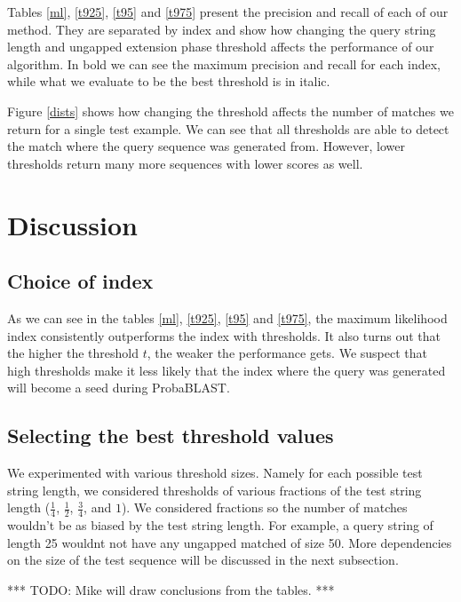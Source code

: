 \documentclass[12pt]{IEEEtran}
\begin{document}
Tables \ref{ml}, \ref{t925}, \ref{t95} and \ref{t975} present the precision and recall of each of our method. They are separated by index and show how changing the query string length and ungapped extension phase threshold affects the performance of our algorithm. In bold we can see the maximum precision and recall for each index, while what we evaluate to be the best threshold is in italic.

Figure \ref{dists} shows how changing the threshold affects the number of matches we return for a single test example. We can see that all thresholds are able to detect the match where the query sequence was generated from. However, lower thresholds return many more sequences with lower scores as well.


\section{Discussion}

\subsection{Choice of index}

As we can see in the tables \ref{ml}, \ref{t925}, \ref{t95} and \ref{t975}, the maximum likelihood index consistently outperforms the index with thresholds. It also turns out that the higher the threshold $t$, the weaker the performance gets. We suspect that high thresholds make it less likely that the index where the query was generated will become a seed during ProbaBLAST. 

\subsection{Selecting the best threshold values}


We experimented with various threshold sizes. Namely for each possible test string length, we considered thresholds of various fractions of the test string length ($\frac{1}{4}$, $\frac{1}{2}$, $\frac{3}{4}$, and $1$). We considered fractions so the number of matches wouldn't be as biased by the test string length. For example, a query string of length 25 wouldnt not have any ungapped matched of size 50. More dependencies on the size of the test sequence will be discussed in the next subsection.

*** TODO: Mike will draw conclusions from the tables. ***
\end{document}
